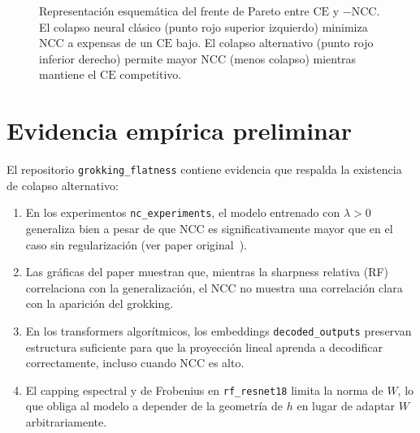 \documentclass[12pt,a4paper]{report}
\newcommand{\NCC}{\text{NCC}}
\newcommand{\CE}{\text{CE}}
\begin{document}
\begin{figure}[h]
\centering
{}
\caption{Representación esquemática del frente de Pareto entre $\CE$ y $-\NCC$. El colapso neural clásico (punto rojo superior izquierdo) minimiza $\NCC$ a expensas de un $\CE$ bajo. El colapso alternativo (punto rojo inferior derecho) permite mayor $\NCC$ (menos colapso) mientras mantiene el $\CE$ competitivo.}
\label{fig:pareto}
\end{figure}

\section{Evidencia empírica preliminar}

El repositorio \texttt{grokking\_flatness} contiene evidencia que respalda la existencia de colapso alternativo:

\begin{enumerate}
    \item En los experimentos \texttt{nc\_experiments}, el modelo entrenado con $\lambda > 0$ generaliza bien a pesar de que NCC es significativamente mayor que en el caso sin regularización (ver paper original~\cite{han2025flatness}).

    \item Las gráficas del paper muestran que, mientras la sharpness relativa (RF) correlaciona con la generalización, el NCC no muestra una correlación clara con la aparición del grokking.

    \item En los transformers algorítmicos, los embeddings \texttt{decoded\_outputs} preservan estructura suficiente para que la proyección lineal aprenda a decodificar correctamente, incluso cuando NCC es alto.

    \item El capping espectral y de Frobenius en \texttt{rf\_resnet18} limita la norma de $W$, lo que obliga al modelo a depender de la geometría de $h$ en lugar de adaptar $W$ arbitrariamente.
\end{enumerate}
\end{document}
